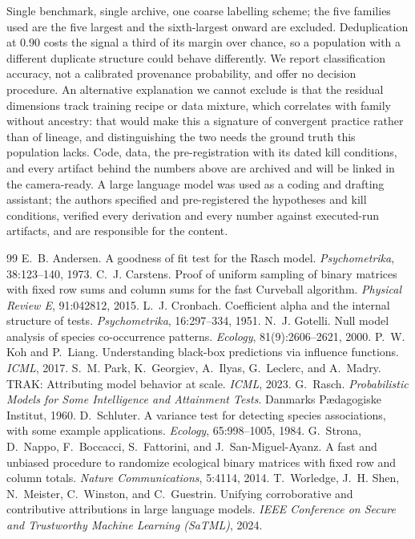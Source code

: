 \documentclass{article}
\begin{document}
Single benchmark, single archive, one coarse labelling scheme; the five families used are the five
largest and the sixth-largest onward are excluded. Deduplication at $0.90$ costs the signal a
third of its margin over chance, so a population with a different duplicate structure could behave
differently. We report classification accuracy, not a calibrated provenance probability, and offer
no decision procedure. An alternative explanation we cannot exclude is that the residual dimensions
track training recipe or data mixture, which correlates with family without ancestry: that would
make this a signature of convergent practice rather than of lineage, and distinguishing the two
needs the ground truth this population lacks. Code, data, the pre-registration with its dated kill
conditions, and every artifact behind the numbers above are archived and will be linked in the
camera-ready. A large language model was used as a coding and drafting assistant; the authors
specified and pre-registered the hypotheses and kill conditions, verified every derivation and
every number against executed-run artifacts, and are responsible for the content.

\begin{thebibliography}{99}
\small
{} E.~B. Andersen. A goodness of fit test for the Rasch model. \emph{Psychometrika}, 38:123--140, 1973.
 C.~J. Carstens. Proof of uniform sampling of binary matrices with fixed row sums and column sums for the fast Curveball algorithm. \emph{Physical Review E}, 91:042812, 2015.
 L.~J. Cronbach. Coefficient alpha and the internal structure of tests. \emph{Psychometrika}, 16:297--334, 1951.
 N.~J. Gotelli. Null model analysis of species co-occurrence patterns. \emph{Ecology}, 81(9):2606--2621, 2000.
 P.~W. Koh and P.~Liang. Understanding black-box predictions via influence functions. \emph{ICML}, 2017.
 S.~M. Park, K.~Georgiev, A.~Ilyas, G.~Leclerc, and A.~Madry. TRAK: Attributing model behavior at scale. \emph{ICML}, 2023.
 G.~Rasch. \emph{Probabilistic Models for Some Intelligence and Attainment Tests}. Danmarks P\ae dagogiske Institut, 1960.
 D.~Schluter. A variance test for detecting species associations, with some example applications. \emph{Ecology}, 65:998--1005, 1984.
 G.~Strona, D.~Nappo, F.~Boccacci, S.~Fattorini, and J.~San-Miguel-Ayanz. A fast and unbiased procedure to randomize ecological binary matrices with fixed row and column totals. \emph{Nature Communications}, 5:4114, 2014.
 T.~Worledge, J.~H. Shen, N.~Meister, C.~Winston, and C.~Guestrin. Unifying corroborative and contributive attributions in large language models. \emph{IEEE Conference on Secure and Trustworthy Machine Learning (SaTML)}, 2024.
\end{thebibliography}
\end{document}
